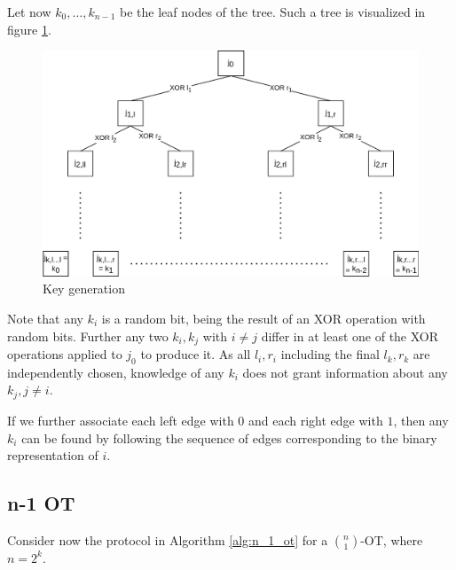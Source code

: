 \documentclass[a4paper]{scrreprt}
\begin{document}
Let now $k_0, \ldots, k_{n-1}$ be the leaf nodes of the tree. Such a tree is
visualized in figure \ref{fig:keygen}.

\begin{figure}[h]
        \centering
		\includegraphics[width=\textwidth]{resources/key_generation}
		\caption{Key generation}
		\label{fig:keygen}
\end{figure}

Note that any $k_i$ is a random bit, being the result of an XOR operation with
random bits. Further any two $k_i, k_j$ with $i \neq j$ differ in at least one
of the XOR operations applied to $j_0$ to produce it. As all $l_i, r_i$
including the final $l_k, r_k$ are independently chosen, knowledge of any $k_i$
does not grant information about any $k_j, j \neq i$.

If we further associate each left edge with $0$ and each right edge with $1$,
then any $k_i$ can be found by following the sequence of edges corresponding to
the binary representation of $i$.

\subsection{n-1 OT}

Consider now the protocol in Algorithm \ref{alg:n_1_ot} for a
$\binom{n}{1}$-OT, where $n = 2^k$.
\end{document}
